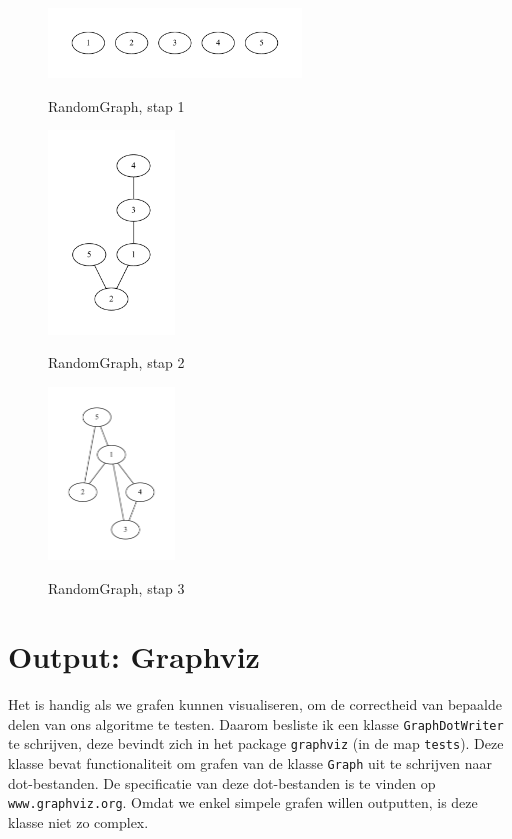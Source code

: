 \documentclass{article}
\begin{document}
\begin{figure}
\begin{center}
\includegraphics[width=0.6\textwidth]{images/randomgraph-01.pdf}
\caption{RandomGraph, stap 1}
\label{fig:randomgraph-01}
\includegraphics[width=0.3\textwidth]{images/randomgraph-02.pdf}
\caption{RandomGraph, stap 2}
\label{fig:randomgraph-02}
\includegraphics[width=0.3\textwidth]{images/randomgraph-03.pdf}
\caption{RandomGraph, stap 3}
\label{fig:randomgraph-03}
\end{center}
\end{figure}

\section{Output: Graphviz}
Het is handig als we grafen kunnen visualiseren, om de correctheid van bepaalde
delen van ons algoritme te testen. Daarom besliste ik een klasse
\verb#GraphDotWriter# te schrijven, deze bevindt zich in het package
\verb#graphviz# (in de map \verb#tests#). Deze klasse bevat functionaliteit om
grafen van de klasse \verb#Graph# uit te schrijven naar dot-bestanden. De
specificatie van deze dot-bestanden is te vinden op \verb#www.graphviz.org#.
Omdat we enkel simpele grafen willen outputten, is deze klasse niet zo complex.
\end{document}
